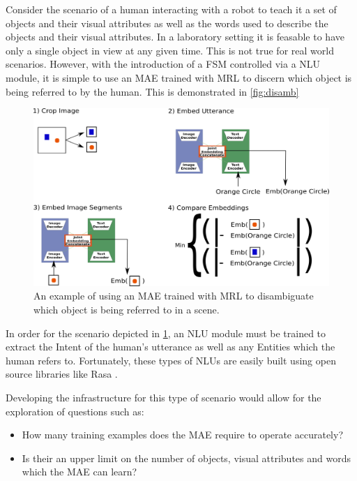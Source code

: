 Consider the scenario of a human interacting with a robot to teach it a set of objects and their visual attributes as well as the words used to describe the objects and their visual attributes. In a laboratory setting it is feasable to have only a single object in view at any given time. This is not true for real world scenarios. However, with the introduction of a \ac{FSM} controlled via a \ac{NLU} module, it is simple to use an \ac{MAE} trained with \ac{MRL} to discern which object is being referred to by the human. This is demonstrated in \autoref{fig:disamb}

\begin{figure}
\centering
\includegraphics[width=\textwidth]{Figs/shapes/findingRefferant.png}
\caption{An example of using an MAE trained with MRL to disambiguate which object is being referred to in a scene.}
\label{fig:disamb}
\end{figure}

In order for the scenario depicted in \ref{fig:disamb}, an \ac{NLU} module must be trained to extract the Intent of the human's utterance as well as any Entities which the human refers to. Fortunately, these types of \acp{NLU} are easily built using open source libraries like Rasa \cite{rasa}.



Developing the infrastructure for this type of scenario would allow for the exploration of questions such as:

\begin{itemize}
\item How many training examples does the \ac{MAE} require to operate accurately?
\item Is their an upper limit on the number of objects, visual attributes and words which the \ac{MAE} can learn?
\end{itemize}

